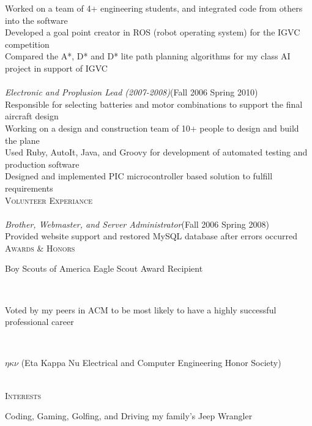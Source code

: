 \documentclass[10pt,a4paper,oneside]{article}
\newcommand{\SectionHeader}[1]{\textsc{#1} \vspace{-2px}\\}
\newcommand{\CompanyHeader}[4]{\hspace*{.52in}{\bf#1} \hfill #2 \\\hspace*{.5in}\emph{#3}\hfill (#4) \\}
\newcommand{\ResumeItem}[1]{\hspace*{.5in}\textopenbullet\hspace*{.2in}#1\\}
\newcommand{\TextBlock}[1]
{\hspace*{.5in} \begin{minipage}[t]{6.75in} #1 \end{minipage}\\}
\begin{document}
 \ResumeItem{Worked on a team of 4+ engineering students, and integrated code from others into the software}
 \ResumeItem{Developed a goal point creator in ROS (robot operating system) for the IGVC competition}
 \ResumeItem{Compared the A*, D* and D* lite path planning algorithms for my class AI project in support of IGVC}
 \CompanyHeader{Design Build Fly/DBF}{}{Electronic and Proplusion Lead (2007-2008)}{Fall 2006 \textendash { }Spring 2010}
 \ResumeItem{Responsible for selecting batteries and motor combinations to support the final aircraft design}
 \ResumeItem{Working on a design and construction team of 10+ people to design and build the plane}
 \ResumeItem{Used Ruby, AutoIt, Java, and Groovy for development of automated testing and production software} 
\ResumeItem{Designed and implemented PIC microcontroller based solution to fulfill requirements}
\SectionHeader{Volunteer Experiance}
 \CompanyHeader{Alpha Phi Omega (National Service Fraternity)}{}{Brother, Webmaster, and Server Administrator}{Fall 2006 \textendash { }Spring 2008}
 \ResumeItem{Provided website support and restored MySQL database after errors occurred}
\SectionHeader{Awards \& Honors}
\TextBlock{Boy Scouts of America Eagle Scout Award Recipient}
\TextBlock{Voted by my peers in ACM to be most likely to have a highly successful professional career}
\TextBlock{$\eta\kappa\nu$ (Eta Kappa Nu Electrical and Computer Engineering Honor Society)}
\SectionHeader{Interests}
\TextBlock{Coding, Gaming, Golfing, and Driving my family’s Jeep Wrangler}
\end{document}
